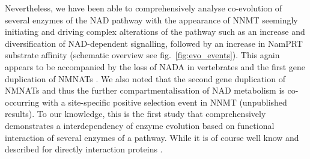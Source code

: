 Nevertheless, we have been able to comprehensively analyse co-evolution of several enzymes of the NAD pathway with the appearance of NNMT seemingly initiating and driving complex alterations of the pathway such as an increase and diversification of NAD-dependent signalling, followed by an increase in NamPRT substrate affinity (schematic overview see fig.~\ref{fig:evo_events}). This again appears to be accompanied by the loss of NADA in vertebrates and the first gene duplication of NMNATs \cite{Lau2010}. We also noted that the second gene duplication of NMNATs and thus the further compartmentalisation of NAD metabolism is co-occurring with a site-specific positive selection event in NNMT (unpublished results). To our knowledge, this is the first study that comprehensively demonstrates a interdependency of enzyme evolution based on functional interaction of several enzymes of a pathway. While it is of course well know and described for directly interaction proteins .






